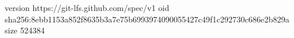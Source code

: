 version https://git-lfs.github.com/spec/v1
oid sha256:8ebb1153a852f8635b3a7e75b6993974090055427c49f1c292730c686e2b829a
size 524384

